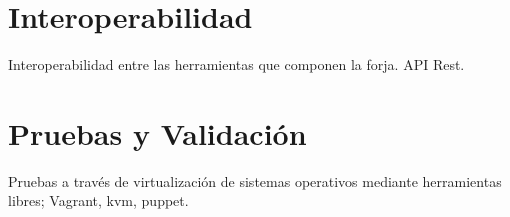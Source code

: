 
\section{Interoperabilidad}
\label{sec:interoperabilidad}

\par Interoperabilidad entre las herramientas que componen la forja. API Rest.


\section{Pruebas y Validación}
\label{sec:pruebas-validacion}

\par Pruebas a trav\'es de virtualizaci\'on de sistemas operativos mediante herramientas libres; Vagrant, kvm, puppet.

